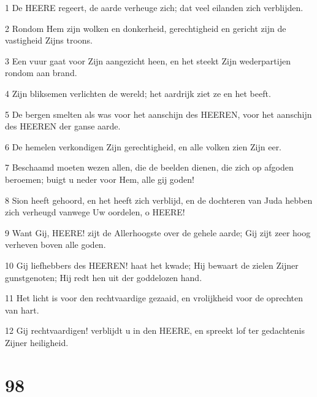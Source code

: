 \par 1 De HEERE regeert, de aarde verheuge zich; dat veel eilanden zich verblijden.
\par 2 Rondom Hem zijn wolken en donkerheid, gerechtigheid en gericht zijn de vastigheid Zijns troons.
\par 3 Een vuur gaat voor Zijn aangezicht heen, en het steekt Zijn wederpartijen rondom aan brand.
\par 4 Zijn bliksemen verlichten de wereld; het aardrijk ziet ze en het beeft.
\par 5 De bergen smelten als was voor het aanschijn des HEEREN, voor het aanschijn des HEEREN der ganse aarde.
\par 6 De hemelen verkondigen Zijn gerechtigheid, en alle volken zien Zijn eer.
\par 7 Beschaamd moeten wezen allen, die de beelden dienen, die zich op afgoden beroemen; buigt u neder voor Hem, alle gij goden!
\par 8 Sion heeft gehoord, en het heeft zich verblijd, en de dochteren van Juda hebben zich verheugd vanwege Uw oordelen, o HEERE!
\par 9 Want Gij, HEERE! zijt de Allerhoogste over de gehele aarde; Gij zijt zeer hoog verheven boven alle goden.
\par 10 Gij liefhebbers des HEEREN! haat het kwade; Hij bewaart de zielen Zijner gunstgenoten; Hij redt hen uit der goddelozen hand.
\par 11 Het licht is voor den rechtvaardige gezaaid, en vrolijkheid voor de oprechten van hart.
\par 12 Gij rechtvaardigen! verblijdt u in den HEERE, en spreekt lof ter gedachtenis Zijner heiligheid.

\chapter{98}

